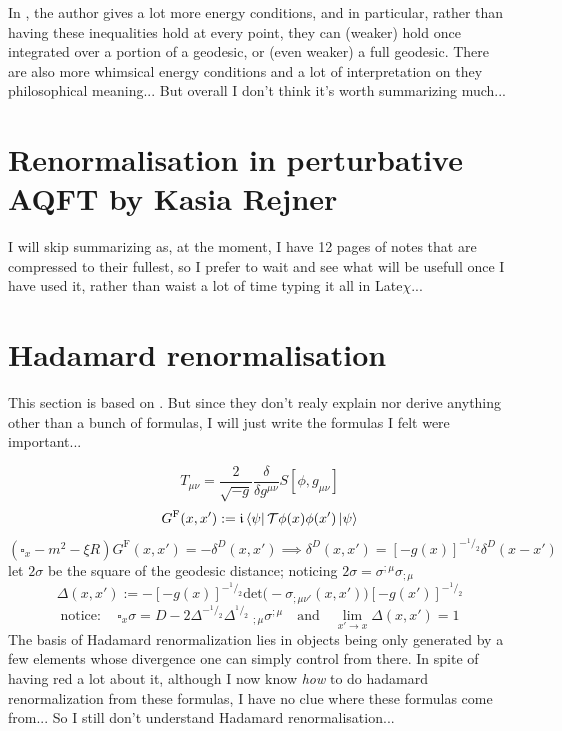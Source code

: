 \documentclass[a4paper,11pt]{article}
\numberwithin{equation}{section}
\theoremstyle{definition}
\begin{document}
In \cite{Primer}, the author gives a lot more energy conditions, and in particular, rather than having these inequalities hold at every point, they can (weaker) hold once integrated over a portion of a geodesic, or (even weaker) a full geodesic.
There are also more whimsical energy conditions and a lot of interpretation on they philosophical meaning... But overall I don't think it's worth summarizing much...

\section{Renormalisation in perturbative AQFT by Kasia Rejner}
I will skip summarizing \cite{RejConf} as, at the moment, I have 12 pages of notes that are compressed to their fullest, so I prefer to wait and see what will be usefull once I have used it, rather than waist a lot of time typing it all in Late$\chi$...

\section{Hadamard renormalisation}
This section is based on \cite{HadRen}. But since they don't realy explain nor derive anything other than a bunch of formulas, I will just write the formulas I felt were important...

\begin{equation}
    T_{\mu\nu}=\frac{2}{\sqrt{-g}}\frac{\delta}{\delta g^{\mu\nu}}S[\phi,g_{\mu\nu}]
\end{equation}
\begin{equation}
    G^\mathrm{F}(x,x'):=\mathfrak{i}\bra{\psi}\mathcal{T}\phi(x)\phi(x')\ket{\psi}
\end{equation}
\begin{equation}
    (\square_x-m^2-\xi R) G^\mathrm{F}(x,x')=-\delta^D(x,x') \implies \delta^D(x,x')=[-g(x)]^{-^{\!1}\!/_{\!2}}\delta^D(x-x')
\end{equation}
let $2\sigma$ be the square of the geodesic distance; noticing $2\sigma=\sigma^{;\mu}\sigma_{;\mu}$
\begin{equation}
    \Delta(x,x'):=-[-g(x)]^{-^{\!1}\!/_{\!2}} \mathrm{det}\Big(-\sigma_{;\mu\nu'}(x,x')\Big)[-g(x')]^{-^{\!1}\!/_{\!2}}
\end{equation}
\begin{equation}
    \mathrm{notice}:\quad \square_x\sigma=D-2\Delta^{-^{\!1}\!/_{\!2}}\Delta^{^{1}\!/_{\!2}}\;_{;\mu}\sigma^{;\mu}\quad \mathrm{and}\quad \lim_{x'\to x}\Delta(x,x')=1
\end{equation}
The basis of Hadamard renormalization lies in objects being only generated by a few elements whose divergence one can simply control from there. \color{red} In spite of having red a lot about it, although I now know \emph{how} to do hadamard renormalization from these formulas, I have no clue where these formulas come from... So I still don't understand Hadamard renormalisation...\color{black}
\end{document}

